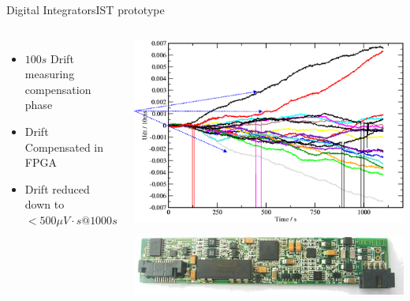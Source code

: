 \documentclass{beamer}
\begin{document}
\begin{frame}{Digital Integrators}{IST prototype}
\begin{columns}
	\begin{itemize}
		\item $100 s$ Drift  measuring compensation phase
		\item Drift Compensated in FPGA
		\item Drift reduced down to   $< 500 \mu V \cdot s @ 1000s$ 
	\end{itemize}
	\begin{center}
		\includegraphics[height = 3 cm]{w7xDrift.png}

		\includegraphics[height = 1 cm]{AtcaAdc.jpg}
	\end{center}
\end{columns}
\end{frame}
\end{document}
